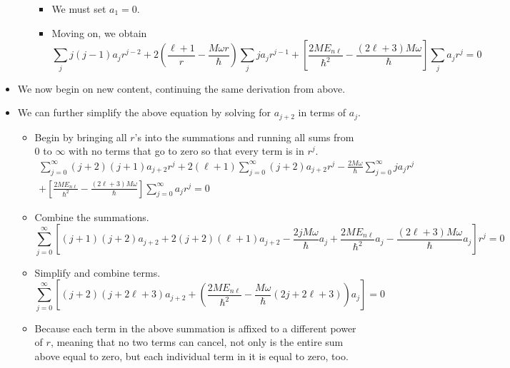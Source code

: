 \documentclass[../notes.tex]{subfiles}
\begin{document}
\begin{itemize}
\begin{itemize}
\begin{itemize}
            \item We must set $a_1=0$.
            \item Moving on, we obtain
            \begin{equation*}
                \sum_jj(j-1)a_jr^{j-2}+2\left( \frac{\ell+1}{r}-\frac{M\omega r}{\hbar} \right)\sum_jja_jr^{j-1}+\left[ \frac{2ME_{n\ell}}{\hbar^2}-\frac{(2\ell+3)M\omega}{\hbar} \right]\sum_ja_jr^j = 0
            \end{equation*}
        \end{itemize}
    \end{itemize}
    \item We now begin on new content, continuing the same derivation from above.
    \item We can further simplify the above equation by solving for $a_{j+2}$ in terms of $a_j$.
    \begin{itemize}
        \item Begin by bringing all $r$'s into the summations and running all sums from $0$ to $\infty$ with no terms that go to zero so that every term is in $r^j$.
        \begin{multline*}
            \sum_{j=0}^\infty(j+2)(j+1)a_{j+2}r^j+2(\ell+1)\sum_{j=0}^\infty(j+2)a_{j+2}r^j-\frac{2M\omega}{\hbar}\sum_{j=0}^\infty ja_jr^j\\
            +\left[ \frac{2ME_{n\ell}}{\hbar^2}-\frac{(2\ell+3)M\omega}{\hbar} \right]\sum_{j=0}^\infty a_jr^j = 0
        \end{multline*}
        \item Combine the summations.
        \begin{equation*}
            \sum_{j=0}^\infty\left[ (j+1)(j+2)a_{j+2}+2(j+2)(\ell+1)a_{j+2}-\frac{2jM\omega}{\hbar}a_j+\frac{2ME_{n\ell}}{\hbar^2}a_j-\frac{(2\ell+3)M\omega}{\hbar}a_j \right]r^j = 0
        \end{equation*}
        \item Simplify and combine terms.
        \begin{equation*}
            \sum_{j=0}^\infty\left[ (j+2)(j+2\ell+3)a_{j+2}+\left( \frac{2ME_{n\ell}}{\hbar^2}-\frac{M\omega}{\hbar}(2j+2\ell+3) \right)a_j \right] = 0
        \end{equation*}
        \item Because each term in the above summation is affixed to a different power of $r$, meaning that no two terms can cancel, not only is the entire sum above equal to zero, but each individual term in it is equal to zero, too.

\end{itemize}
\end{itemize}
\end{document}
